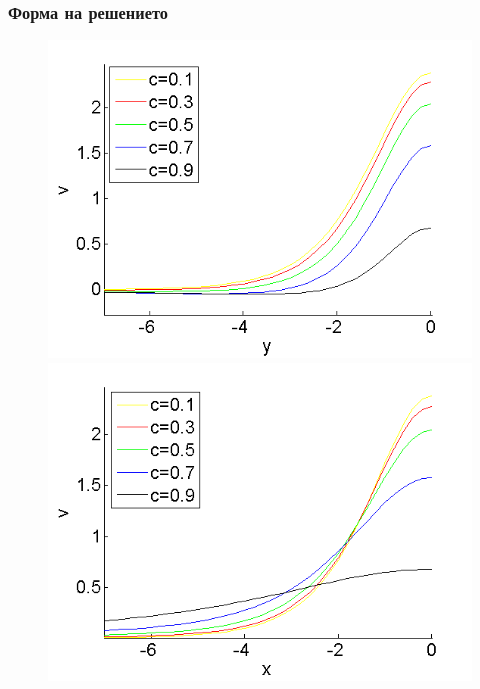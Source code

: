 \documentclass{beamer}
\begin{document}
\begin{frame}
\frametitle{Форма на решението}
\begin{figure}
	\begin{minipage}[b]{0.45\linewidth}
		\raggedleft
		\includegraphics[width=\linewidth]{../Thesis/SolutionProfiles/ChristovIVX=0_ZB2_bt1_c010_090_h020_O(h^6).png}
	\end{minipage}	
	\begin{minipage}[b]{0.45\linewidth}
		\raggedright
		 \includegraphics[width=\linewidth]{../Thesis/SolutionProfiles/ChristovIVY=0_ZB2_bt1_c010_090_h020_O(h^6).png}
	\end{minipage}
	\begin{minipage}[b]{0.45\linewidth}

\end{minipage}
\end{figure}
\end{frame}
\end{document}
